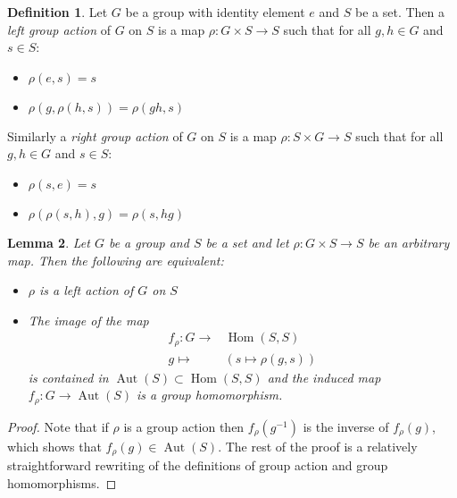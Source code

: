 \documentclass[a4paper,12pt,reqno]{amsart}
\DeclareMathOperator{\Hom}{Hom}
\DeclareMathOperator{\Aut}{Aut}
\newtheorem{lemma}{Lemma}
\theoremstyle{definition}
\newtheorem{definition}[lemma]{Definition}
\numberwithin{lemma}{section}
\numberwithin{equation}{section}
\numberwithin{figure}{section}
\begin{document}
\begin{definition}\label{def:group_action}
	Let $G$ be a group with identity element $e$ and $S$ be a set. Then a \textit{left group action} of $G$ on $S$ is a map $\rho: G \times S \to S$  such that for all $g,h \in G$ and $s \in S$:
	\begin{itemize}
		\item $\rho(e, s) = s$
		\item $\rho(g,\rho(h,s))=\rho(gh,s)$
	\end{itemize}
Similarly a \textit{right group action} of $G$ on $S$ is a map $\rho: S \times G \to S$  such that for all $g,h \in G$ and $s \in S$:
\begin{itemize}
	\item $\rho(s,e) = s$
	\item $\rho(\rho(s,h),g)=\rho(s,hg)$
\end{itemize}
\end{definition}

\begin{lemma}\label{stmt:left-group-action-is-group-hom}
Let $G$ be a group and $S$ be a set and let $\rho : G \times S \to S$ be an arbitrary map. Then the following are equivalent:
\begin{itemize}
	\item $\rho$ is a left action of $G$ on $S$
	\item The image of the map\begin{align*}
	f_\rho : G \to& \Hom(S,S)\\
	g \mapsto& (s\mapsto \rho(g,s))
	\end{align*} is contained in $\Aut(S) \subset \Hom(S,S)$ and the induced map $f_\rho : G \to \Aut(S)$ is a group homomorphism.
\end{itemize}
\end{lemma}
\begin{proof}
Note that if $\rho$ is a group action then $f_\rho(g^{-1})$ is the inverse of $f_\rho(g)$, which shows that $f_\rho(g) \in \Aut(S)$. The rest of the proof is a relatively straightforward rewriting of the definitions of group action and group homomorphisms.	%
\end{proof}
\end{document}
